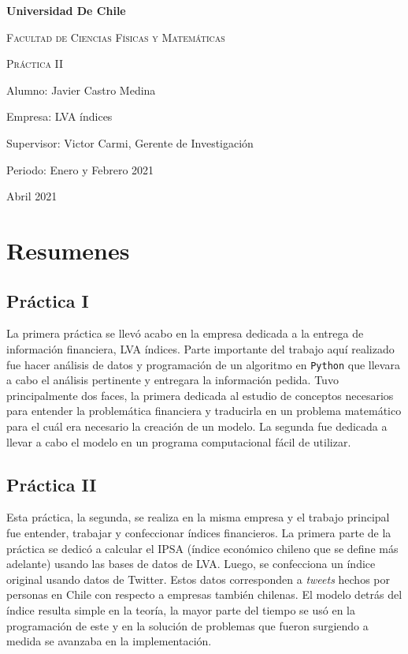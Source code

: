 \documentclass{article}
\begin{document}


\begin{titlepage}
	\centering
	{\bfseries\LARGE Universidad De Chile \par}
	\vspace{1cm}
	{\scshape\Large Facultad de Ciencias Físicas y Matemáticas \par}
	\vspace{3cm}
	{\scshape\Huge Práctica II \par}
	\vfill
	{\Large Alumno: Javier Castro Medina\par}
	{\Large Empresa: LVA índices\par}
	{\Large Supervisor: Victor Carmi, Gerente de Investigación \par}
	{\Large Periodo: Enero y Febrero 2021\par}
	\vfill
	{\Large Abril 2021 \par}
\end{titlepage}
\newpage
\section{Resumenes}
\subsection{Práctica I}
	La primera práctica se llevó acabo en la empresa dedicada a la entrega de información financiera, LVA índices. Parte importante del trabajo aquí realizado fue hacer análisis de datos y programación de un algoritmo en \texttt{Python} que llevara a cabo el análisis pertinente y entregara la información pedida. Tuvo principalmente dos faces, la primera dedicada al estudio de conceptos necesarios para entender la problemática financiera y traducirla en un problema matemático para el cuál era necesario la creación de un modelo. La segunda fue dedicada a llevar a cabo el modelo en un programa computacional fácil de utilizar.
\subsection{Práctica II}
	Esta práctica, la segunda, se realiza en la misma empresa y el trabajo principal fue entender, trabajar y confeccionar índices financieros. La primera parte de la práctica se dedicó a calcular el IPSA (índice económico chileno que se define más adelante) usando las bases de datos de LVA. Luego, se confecciona un índice original usando datos de Twitter. Estos datos corresponden a \textit{tweets} hechos por personas en Chile con respecto a empresas también chilenas. El modelo detrás del índice resulta simple en la teoría, la mayor parte del tiempo se usó en la programación de este y en la solución de problemas que fueron surgiendo a medida se avanzaba en la implementación.
\end{document}
